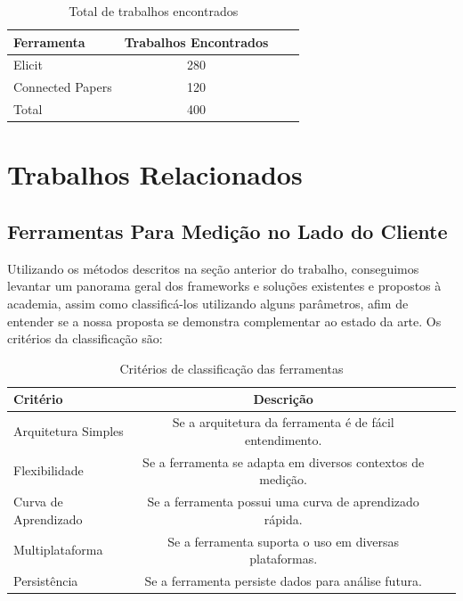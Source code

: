 \documentclass[12pt]{tcc}
\begin{document}
\begin{table}[!ht]
	\centering
	\caption{Total de trabalhos encontrados}
	\begin{tabular}{l  c L{1.5cm} R{1.5cm}}
		\toprule
		\textbf{Ferramenta} & \textbf{Trabalhos Encontrados} \\
		\midrule
		Elicit  &  280  \\
		Connected Papers  &  120  \\
		\midrule
		Total  &  400  \\
		\bottomrule
	\end{tabular}
	\label{tab:trabalhos-encontrados}
\end{table}

\chapter{Trabalhos Relacionados}
\label{sec:trabalhos_relacionados}
	\label{sec:trab_relacionados}

	\section{Ferramentas Para Medição no Lado do Cliente}
	Utilizando os métodos descritos na seção anterior do trabalho, conseguimos levantar um panorama geral dos frameworks e soluções existentes e propostos à academia, assim como classificá-los utilizando alguns parâmetros, afim de entender se a nossa proposta se demonstra complementar ao estado da arte. 
	Os critérios da classificação são: 


	\begin{table}[!ht]
		\centering
		\caption{Critérios de classificação das ferramentas}
		\begin{tabular}{l c L{1.5cm} R{1.5cm}}
			\toprule
			\textbf{Critério} & \textbf{Descrição}\\
			\midrule 
			Arquitetura Simples & Se a arquitetura da ferramenta é de fácil entendimento.\\
			Flexibilidade&Se a ferramenta se adapta em diversos contextos de medição.\\
			Curva de Aprendizado&Se a ferramenta possui uma curva de aprendizado rápida.\\
			Multiplataforma&Se a ferramenta suporta o uso em diversas plataformas.\\
			Persistência&Se a ferramenta persiste dados para análise futura.\\
			\bottomrule
		\end{tabular}
		\label{tab:string-busca-connected-papers}
	\end{table}
\end{document}
